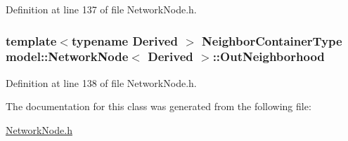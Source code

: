 Definition at line 137 of file Network\+Node.\+h.

\hypertarget{classmodel_1_1_network_node_a9a24def8118a94f9fd189357c03312e4}{}
\subsubsection[{Out\+Neighborhood}]{\setlength{\rightskip}{0pt plus 5cm}template$<$typename Derived $>$ {\bf Neighbor\+Container\+Type} {\bf model\+::\+Network\+Node}$<$ Derived $>$\+::Out\+Neighborhood\hspace{0.3cm}{\ttfamily [protected]}}\label{classmodel_1_1_network_node_a9a24def8118a94f9fd189357c03312e4}


Definition at line 138 of file Network\+Node.\+h.



The documentation for this class was generated from the following file\+:\begin{DoxyCompactItemize}
\item 
\hyperlink{_network_node_8h}{Network\+Node.\+h}\end{DoxyCompactItemize}
